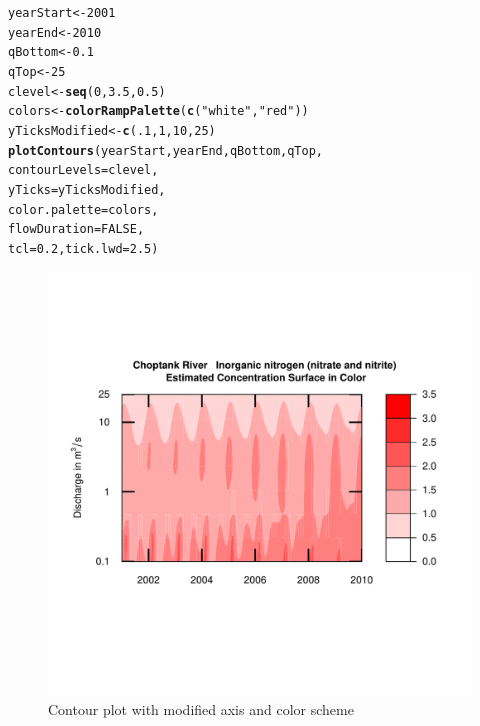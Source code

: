 \documentclass[a4paper,11pt]{article}\usepackage[]{graphicx}\usepackage[]{color}
\makeatletter
\newcommand{\hlnum}[1]{\textcolor[rgb]{0.686,0.059,0.569}{#1}}%
\newcommand{\hlstr}[1]{\textcolor[rgb]{0.192,0.494,0.8}{#1}}%
\newcommand{\hlstd}[1]{\textcolor[rgb]{0.345,0.345,0.345}{#1}}%
\newcommand{\hlkwb}[1]{\textcolor[rgb]{0.69,0.353,0.396}{#1}}%
\newcommand{\hlkwc}[1]{\textcolor[rgb]{0.333,0.667,0.333}{#1}}%
\newcommand{\hlkwd}[1]{\textcolor[rgb]{0.737,0.353,0.396}{\textbf{#1}}}%
\newenvironment{kframe}{%
 \def\at@end@of@kframe{}%
 \ifinner\ifhmode%
  \def\at@end@of@kframe{\end{minipage}}%
  \begin{minipage}{\columnwidth}%
 \fi\fi%
 \def\FrameCommand##1{\hskip\@totalleftmargin \hskip-\fboxsep
 \colorbox{shadecolor}{##1}\hskip-\fboxsep
     \hskip-\linewidth \hskip-\@totalleftmargin \hskip\columnwidth}%
 \MakeFramed {\advance\hsize-\width
   \@totalleftmargin\z@ \linewidth\hsize
   \@setminipage}}%
 {\par\unskip\endMakeFramed%
 \at@end@of@kframe}
\newenvironment{knitrout}{}{} %
\makeatother
\begin{document}
\begin{knitrout}
\color{fgcolor}\begin{kframe}
\begin{alltt}
\hlstd{yearStart} \hlkwb{<-} \hlnum{2001}
\hlstd{yearEnd} \hlkwb{<-} \hlnum{2010}
\hlstd{qBottom} \hlkwb{<-} \hlnum{0.1}
\hlstd{qTop}\hlkwb{<-} \hlnum{25}
\hlstd{clevel} \hlkwb{<-} \hlkwd{seq}\hlstd{(}\hlnum{0}\hlstd{,}\hlnum{3.5}\hlstd{,}\hlnum{0.5}\hlstd{)}
\hlstd{colors} \hlkwb{<-} \hlkwd{colorRampPalette}\hlstd{(}\hlkwd{c}\hlstd{(}\hlstr{"white"}\hlstd{,}\hlstr{"red"}\hlstd{))}
\hlstd{yTicksModified} \hlkwb{<-} \hlkwd{c}\hlstd{(}\hlnum{.1}\hlstd{,}\hlnum{1}\hlstd{,}\hlnum{10}\hlstd{,}\hlnum{25}\hlstd{)}
\hlkwd{plotContours}\hlstd{(yearStart,yearEnd,qBottom,qTop,}
             \hlkwc{contourLevels} \hlstd{= clevel,}
             \hlkwc{yTicks}\hlstd{=yTicksModified,}
             \hlkwc{color.palette}\hlstd{=colors,}
             \hlkwc{flowDuration}\hlstd{=}\hlnum{FALSE}\hlstd{,}
             \hlkwc{tcl}\hlstd{=}\hlnum{0.2}\hlstd{,}\hlkwc{tick.lwd}\hlstd{=}\hlnum{2.5}\hlstd{)}
\end{alltt}
\end{kframe}\begin{figure}[]

\includegraphics[width=1\linewidth,height=1\linewidth]{figure/modifiedContour1} \caption[Contour plot with modified axis and color scheme]{Contour plot with modified axis and color scheme\label{fig:modifiedContour1}}
\end{figure}


\end{knitrout}
\end{document}
